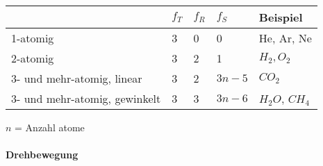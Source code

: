 \noindent
\begin{tabularx}{\columnwidth}{@{}XXXXX@{}}
	\hline
	 & $f_T$ & $f_R$ & $f_S$ & Beispiel \\ \hline
	 1-atomig & 3 & 0 & 0 & He, Ar, Ne \\ \hline
	 2-atomig & 3 & 2 & 1 & ${H_2}, {O_2}$ \\ \hline
	 3- und mehr-atomig, linear & 3 & 2 & $3n-5$ & $CO_2$ \\ \hline
	 3- und mehr-atomig, gewinkelt & 3 & 3 & $3n-6$ & $H_2O$, $CH_4$ \\ \hline
\end{tabularx}
\linebreak
$n$ = Anzahl atome
\vspace{1mm}

\paragraph{Drehbewegung}\mbox{}\\
\noindent
